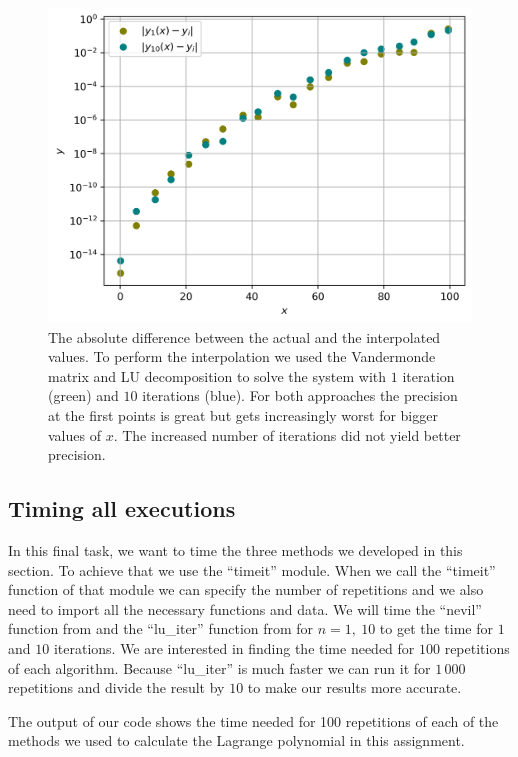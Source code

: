 \documentclass[a4paper,10pt]{article}
\begin{document}
\begin{figure}[H]
  \centering
  \includegraphics[width=0.75\linewidth]{./plots/iter_dif.png}
  \caption{The absolute difference between the actual and the interpolated values. To perform the interpolation we used the Vandermonde matrix and LU decomposition to solve the system with $1$ iteration (green) and $10$ iterations (blue). For both approaches the precision at the first points is great but gets increasingly worst for bigger values of $x$. The increased number of iterations did not yield better precision.}
  \label{fig:iter_dif}
\end{figure}

\subsection{Timing all executions}



In this final task, we want to time the three methods we developed in this section. To achieve that we use the ``timeit'' module. When we call the ``timeit'' function of that module we can specify the number of repetitions and we also need to import all the necessary functions and data. We will time the ``nevil'' function from  and the ``lu\_iter'' function from  for $n=1,\:10$ to get the time for $1$ and $10$ iterations. We are interested in finding the time needed for $100$ repetitions of each algorithm. Because ``lu\_iter'' is much faster we can run it for $1\,000$ repetitions and divide the result by $10$ to make our results more accurate. 



The output of our code shows the time needed for 100 repetitions of each of the methods we used to calculate the Lagrange polynomial in this assignment. 
\end{document}
